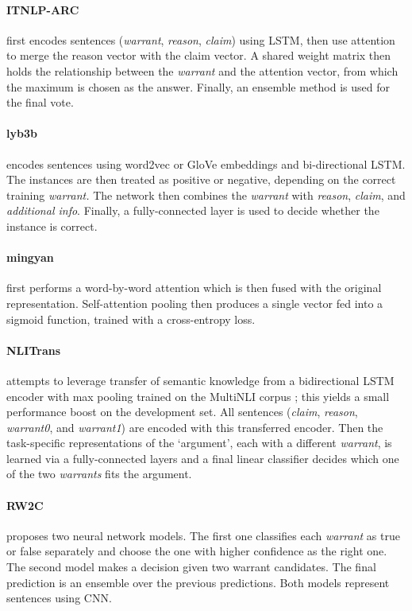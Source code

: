 \paragraph{ITNLP-ARC}
first encodes sentences (\emph{warrant}, \emph{reason}, \emph{claim}) using LSTM, then use attention to merge the reason vector with the claim vector. A shared weight matrix then holds the relationship between the \emph{warrant} and the attention vector, from which the maximum is chosen as the answer. Finally, an ensemble method is used for the final vote.


\paragraph{lyb3b}
encodes sentences using word2vec or GloVe embeddings and bi-directional LSTM. The instances are then treated as positive or negative, depending on the correct training \emph{warrant.} The network then combines the \emph{warrant} with \emph{reason}, \emph{claim}, and \emph{additional info}. Finally, a fully-connected layer is used to decide whether the instance is correct.


\paragraph{mingyan}
first performs a word-by-word attention which is then fused with the original representation. Self-attention pooling then produces a single vector fed into a sigmoid function, trained with a cross-entropy loss.


\paragraph{NLITrans}
attempts to leverage transfer of semantic knowledge from a bidirectional LSTM encoder with max pooling trained on the MultiNLI corpus \cite{nangia-EtAl:2017:RepEval}; this yields a small performance boost on the development set. All sentences (\emph{claim}, \emph{reason}, \emph{warrant0}, and \emph{warrant1}) are encoded with this transferred encoder. Then the task-specific representations of the `argument', each with a different \emph{warrant}, is learned via a fully-connected layers and a final linear classifier decides which one of the two \emph{warrants} fits the argument.


\paragraph{RW2C}
proposes two neural network models. The first one classifies each \emph{warrant} as true or false separately and choose the one with higher confidence as the right one. The second model makes a decision given two warrant candidates. The final prediction is an ensemble over the previous predictions. Both models represent sentences using CNN.



